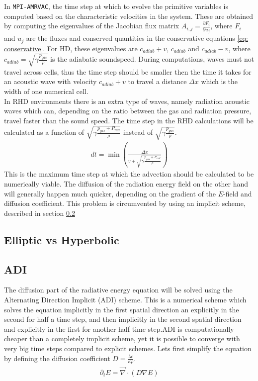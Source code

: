 In \texttt{MPI-AMRVAC}, the time step at which to evolve the primitive variables is computed based on the characteristic velocities in the system. These are obtained by computing the eigenvalues of the Jacobian flux matrix $A_{i,j} = \frac{\partial F_i}{\partial u_j}$, where $F_i$ and $u_j$ are the fluxes and conserved quantities in the conservative equations \eqref{eq: conservative}. For HD, these eigenvalues are $c_{adiab} + v$, $c_{adiab}$ and $c_{adiab} - v$, where $c_{adiab} = \sqrt{\gamma\frac{p_{gas}}{\rho}}$ is the adiabatic soundspeed. During computations, waves must not travel across cells, thus the time step should be smaller then the time it takes for an acoustic wave with velocity $c_{adiab} + v$ to travel a distance $\Delta x$ which is the width of one numerical cell.\\

In RHD environments there is an extra type of waves, namely radiation acoustic waves \citep{Mihalas1984a} which can, depending on the ratio between the gas and radiation pressure, travel faster than the sound speed. The time step in the RHD calculations will be calculated as a function of $\sqrt{\gamma\frac{p_{gas} + P_{rad}}{\rho}}$ instead of $\sqrt{\gamma\frac{p_{gas}}{\rho}}$.
\begin{align}
dt = \min \left(\frac{\Delta x}{v + \sqrt{\gamma\frac{p_{gas} + P_{rad}}{\rho}}} \right)
\end{align}
This is the maximum time step at which the advection should be calculated to be numerically viable. The diffusion of the radiation energy field on the other hand will generally happen much quicker, depending on the gradient of the $E$-field and diffusion coefficient. This problem is circumvented by using an implicit scheme, described in section \ref{section: m: ADI}

\subsection{Elliptic vs Hyperbolic}
\subsection{ADI} \label{section: m: ADI}
The diffusion part of the radiative energy equation will be solved using the Alternating Direction Implicit (ADI) scheme. This is a numerical scheme which solves the equation implicitly in the first spatial direction an explicitly in the second for half a time step, and then implicitly in the second spatial direction and explicitly in the first for another half time step.ADI is computationally cheaper than a completely implicit scheme, yet it is possible to converge with very big time steps compared to explicit schemes. Lets first simplify the equation by defining the diffusion coefficient $D = \frac{\lambda c}{\kappa \rho}$. 
\begin{align}
\partial_t E  = \vec{\nabla} \cdot \left(D \nabla E\right) \label{eq: diffusion}
\end{align}

